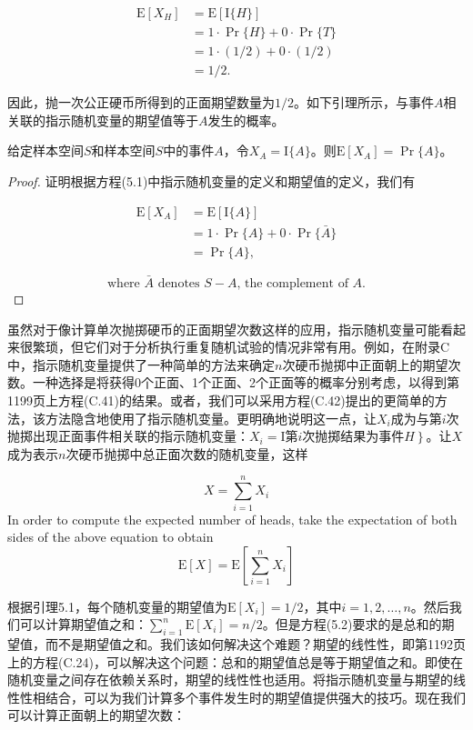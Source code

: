 \documentclass[lang=cn,newtx,10pt,scheme=chinese]{elegantbook}
\begin{document}
$$
\begin{aligned}
\mathrm{E}\left[X_H\right] & =\mathrm{E}[\mathrm{I}\{H\}] \\
& =1 \cdot \operatorname{Pr}\{H\}+0 \cdot \operatorname{Pr}\{T\} \\
& =1 \cdot(1 / 2)+0 \cdot(1 / 2) \\
& =1 / 2 .
\end{aligned}
$$

因此，抛一次公正硬币所得到的正面期望数量为$1/2$。如下引理所示，与事件$A$相关联的指示随机变量的期望值等于$A$发生的概率。

\begin{lemma}{}{}
给定样本空间$S$和样本空间$S$中的事件$A$，令$X_A=\mathrm{I}\{A\}$。则$\mathrm{E}\left[X_A\right]=\operatorname{Pr}\{A\}$。
\end{lemma}

\begin{proof}
证明根据方程(5.1)中指示随机变量的定义和期望值的定义，我们有

$$
\begin{aligned}
\mathrm{E}\left[X_A\right] & =\mathrm{E}[\mathrm{I}\{A\}] \\
& =1 \cdot \operatorname{Pr}\{A\}+0 \cdot \operatorname{Pr}\{\bar{A}\} \\
& =\operatorname{Pr}\{A\},
\end{aligned}
$$

$$
\text { where } \bar{A} \text { denotes } S-A \text {, the complement of } A \text {. }
$$
\end{proof}

虽然对于像计算单次抛掷硬币的正面期望次数这样的应用，指示随机变量可能看起来很繁琐，但它们对于分析执行重复随机试验的情况非常有用。例如，在附录$\mathrm{C}$中，指示随机变量提供了一种简单的方法来确定$n$次硬币抛掷中正面朝上的期望次数。一种选择是将获得0个正面、1个正面、2个正面等的概率分别考虑，以得到第1199页上方程(C.41)的结果。或者，我们可以采用方程(C.42)提出的更简单的方法，该方法隐含地使用了指示随机变量。更明确地说明这一点，让$X_i$成为与第$i$次抛掷出现正面事件相关联的指示随机变量：$X_i=\mathrm{I}$第$i$次抛掷结果为事件$\left.H\right\}$。让$X$成为表示$n$次硬币抛掷中总正面次数的随机变量，这样

$$
X=\sum_{i=1}^n X_i
$$
In order to compute the expected number of heads, take the expectation of both sides of the above equation to obtain
$$
\mathrm{E}[X]=\mathrm{E}\left[\sum_{i=1}^n X_i\right]
$$

根据引理5.1，每个随机变量的期望值为$\mathrm{E}\left[X_i\right]=1 / 2$，其中$i=1,2, \ldots, n$。然后我们可以计算期望值之和：$\sum_{i=1}^n \mathrm{E}\left[X_i\right]=n / 2$。但是方程(5.2)要求的是总和的期望值，而不是期望值之和。我们该如何解决这个难题？期望的线性性，即第1192页上的方程(C.24)，可以解决这个问题：总和的期望值总是等于期望值之和。即使在随机变量之间存在依赖关系时，期望的线性性也适用。将指示随机变量与期望的线性性相结合，可以为我们计算多个事件发生时的期望值提供强大的技巧。现在我们可以计算正面朝上的期望次数：
\end{document}

